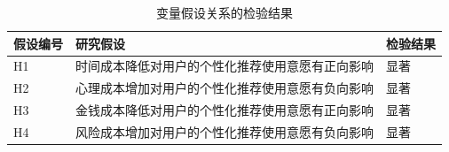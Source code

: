 \begin{table}[H]
\centering
\caption{变量假设关系的检验结果}
\label{tab:result}
\begin{tabular}{@{}lll@{}}
\toprule
\textbf{假设编号} & \textbf{研究假设}            & \textbf{检验结果} \\ \midrule
H1            & 时间成本降低对用户的个性化推荐使用意愿有正向影响 & 显著            \\
H2            & 心理成本增加对用户的个性化推荐使用意愿有负向影响 & 显著            \\
H3            & 金钱成本降低对用户的个性化推荐使用意愿有正向影响 & 显著            \\
H4            & 风险成本增加对用户的个性化推荐使用意愿有负向影响 & 显著            \\ \bottomrule
\end{tabular}
\end{table}


